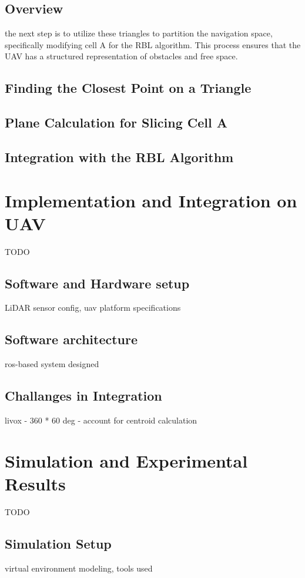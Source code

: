         \subsection{Overview}
        the next step is to utilize these triangles to partition the navigation space, specifically modifying cell 
        A for the RBL algorithm. This process ensures that the UAV has a structured representation of obstacles and free space.
        \subsection{Finding the Closest Point on a Triangle}
        \subsection{Plane Calculation for Slicing Cell A}
        \subsection{Integration with the RBL Algorithm}

    \section{Implementation and Integration on UAV}
        TODO
        \subsection{Software and Hardware setup}
            LiDAR sensor config, uav platform specifications
        \subsection{Software architecture}
            ros-based system designed
        \subsection{Challanges in Integration}
            livox - 360 * 60 deg - account for centroid calculation
    
    \section{Simulation and Experimental Results}
        TODO
        \subsection{Simulation Setup}
            virtual environment modeling, tools used
